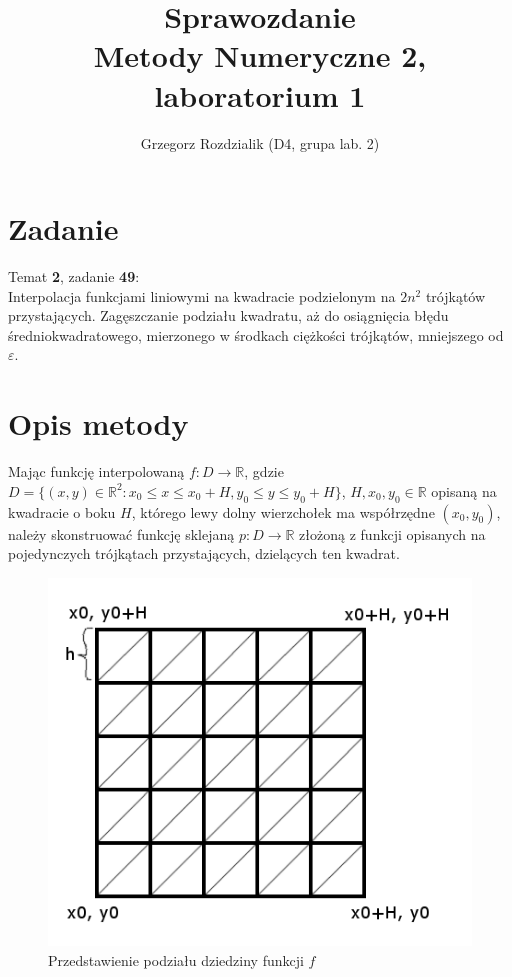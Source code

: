 \documentclass[12pt]{article}
\begin{document}
	\title{Sprawozdanie\\Metody Numeryczne 2, laboratorium 1}
	\author{Grzegorz Rozdzialik (D4, grupa lab. 2)}
	\maketitle	
	
	\section{Zadanie}
	{\Large Temat \textbf{2}, zadanie \textbf{49}:}\\
	Interpolacja funkcjami liniowymi na kwadracie podzielonym na $2n^2$ trójkątów przystających. Zagęszczanie podziału kwadratu, aż do osiągnięcia błędu średniokwadratowego, mierzonego w środkach ciężkości trójkątów, mniejszego od $\varepsilon$.
	
	\section{Opis metody}
	Mając funkcję interpolowaną $f: D \to \mathbb{R}$, gdzie $D = \{ (x, y) \in \mathbb{R}^2: x_0 \leq x \leq x_0 + H, y_0 \leq y \leq y_0 + H\}$, $H, x_0, y_0 \in \mathbb{R}$ opisaną na kwadracie o boku $H$, którego lewy dolny wierzchołek ma współrzędne $(x_0, y_0)$, należy skonstruować funkcję sklejaną $p: D \to \mathbb{R}$ złożoną z funkcji opisanych na pojedynczych trójkątach przystających, dzielących ten kwadrat.
	
	\begin{figure}[]
		\includegraphics[scale=0.8]{square-division.png}
		\caption{Przedstawienie podziału dziedziny funkcji $f$}
	\end{figure}
	
\end{document}
